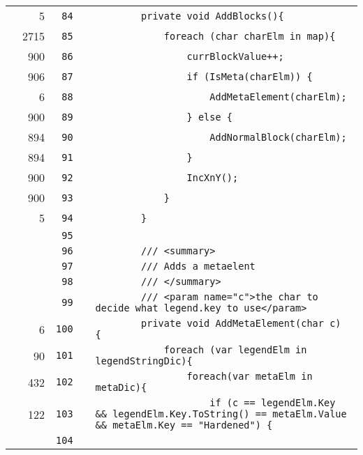 \documentclass[a4paper,landscape,10pt]{article}
\begin{document}
\begin{longtable}[l]{lrrll}
\cellcolor{green} & 5 & \verb~84~ & & \verb~        private void AddBlocks(){~\\
\cellcolor{green} & 2715 & \verb~85~ & & \verb~            foreach (char charElm in map){~\\
\cellcolor{green} & 900 & \verb~86~ & & \verb~                currBlockValue++;~\\
\cellcolor{green} & 906 & \verb~87~ & & \verb~                if (IsMeta(charElm)) {~\\
\cellcolor{green} & 6 & \verb~88~ & & \verb~                    AddMetaElement(charElm);~\\
\cellcolor{green} & 900 & \verb~89~ & & \verb~                } else {~\\
\cellcolor{green} & 894 & \verb~90~ & & \verb~                    AddNormalBlock(charElm);~\\
\cellcolor{green} & 894 & \verb~91~ & & \verb~                }~\\
\cellcolor{green} & 900 & \verb~92~ & & \verb~                IncXnY();~\\
\cellcolor{green} & 900 & \verb~93~ & & \verb~            }~\\
\cellcolor{green} & 5 & \verb~94~ & & \verb~        }~\\
\cellcolor{gray} &  & \verb~95~ & & \verb~~\\
\cellcolor{gray} &  & \verb~96~ & & \verb~        /// <summary>~\\
\cellcolor{gray} &  & \verb~97~ & & \verb~        /// Adds a metaelent~\\
\cellcolor{gray} &  & \verb~98~ & & \verb~        /// </summary>~\\
\cellcolor{gray} &  & \verb~99~ & & \verb~        /// <param name="c">the char to decide what legend.key to use</param>~\\
\cellcolor{green} & 6 & \verb~100~ & & \verb~        private void AddMetaElement(char c) {~\\
\cellcolor{green} & 90 & \verb~101~ & & \verb~            foreach (var legendElm in legendStringDic){~\\
\cellcolor{green} & 432 & \verb~102~ & & \verb~                foreach(var metaElm in metaDic){~\\
\cellcolor{green} & 122 & \verb~103~ & & \verb~                    if (c == legendElm.Key && legendElm.Key.ToString() == metaElm.Value && metaElm.Key == "Hardened") {~\\
\cellcolor{gray} &  & \verb~104~ & & \verb~~\\

\end{longtable}
\end{document}
